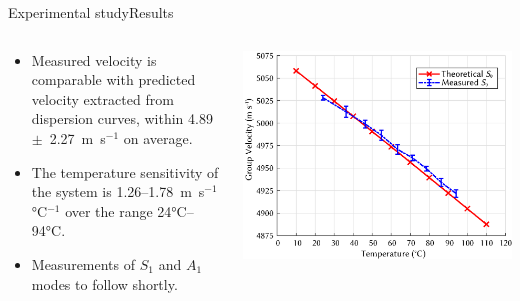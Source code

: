 \documentclass[aspectratio=169, 9pt]{beamer}
\begin{document}

\begin{frame}{Experimental study}{Results}

  \begin{columns}
    \begin{column}{0.5\textwidth}
      \begin{itemize}
        \item Measured velocity is comparable with predicted velocity extracted from dispersion curves, within 4.89~$\pm$~2.27~m~s$^{-1}$ on average. 
        \item The temperature sensitivity of the system is 1.26--1.78~m~s$^{-1}$\si{\degreeCelsius}$^{-1}$ over the range 24\si{\degreeCelsius}--94\si{\degreeCelsius}.
        \item Measurements of $S_1$ and $A_1$ modes to follow shortly. 
      \end{itemize}
    \end{column}
    \begin{column}{0.5\textwidth}  %
        \begin{center}
         \includegraphics[width=\textwidth]{images/aluplatemeasured.eps}
        \end{center}
    \end{column}
  \end{columns}
\end{frame}

\end{document}
